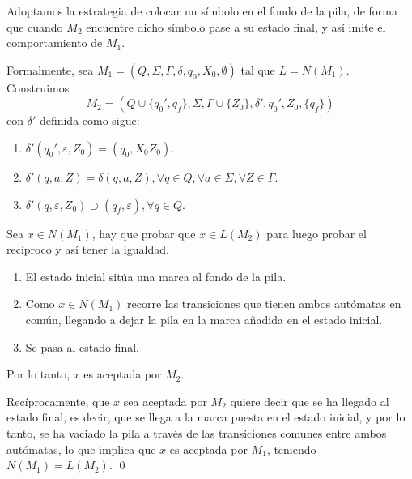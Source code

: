 \begin{Dem}
Adoptamos la estrategia de colocar un símbolo en el fondo de la pila, de forma que cuando $M_2$ encuentre dicho símbolo pase a su estado final, y así imite el comportamiento de $M_1$.

Formalmente, sea $M_1=(Q,\Sigma,\Gamma,\delta,q_0,X_0,\emptyset )$ tal que $L=N(M_1)$. Construimos
$$M_2=(Q\cup \{ q_0',q_f\},\Sigma, \Gamma \cup \{Z_0 \},\delta ',q_0',Z_0,\{q_f\})$$
con $\delta '$ definida como sigue:
\begin{enumerate}
\item $\delta ' (q_0',\varepsilon, Z_0)=(q_0,X_0Z_0)$.
\item $\delta ' (q,a,Z)=\delta (q,a,Z), \forall q\in Q,\forall a \in \Sigma, \forall Z\in \Gamma$.
\item $\delta ' (q,\varepsilon, Z_0)\supset (q_f,\varepsilon ), \forall q \in Q$. 
\end{enumerate}

Sea $x\in N(M_1)$, hay que probar que $x\in L(M_2)$ para luego probar el recíproco y así tener la igualdad. 

\begin{enumerate}
\item El estado inicial sitúa una marca al fondo de la pila.
\item Como $x\in N(M_1)$ recorre las transiciones que tienen ambos autómatas en común, llegando a dejar la pila en la marca añadida en el estado inicial.
\item Se pasa al estado final. 
\end{enumerate}
Por lo tanto, $x$ es aceptada por $M_2$.

Recíprocamente, que $x$ sea aceptada por $M_2$ quiere decir que se ha llegado al estado final, es decir, que se llega a la marca puesta en el estado inicial, y por lo tanto, se ha vaciado la pila a través de las transiciones comunes entre ambos autómatas, lo que implica que $x$ es aceptada por $M_1$, teniendo $N(M_1)=L(M_2)$. 
\qed
\end{Dem}


